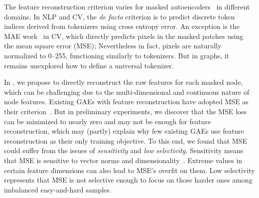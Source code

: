 The feature reconstruction criterion varies %
for masked autoencoders~\cite{devlin2019bert,he2021masked} in different domains. 
In NLP and CV, the \textit{de facto} criterion is to predict discrete token indices derived from tokenizers using cross entropy error. 
An exception is the MAE work~\cite{he2021masked} in CV, which directly predicts pixels in the masked patches using the mean square error (MSE); 
Nevertheless in fact, pixels are naturally normalized to 0--255, functioning similarly to tokenizers. 
But in graphs, it remains unexplored how to define a universal tokenizer. 

In \model, we propose to directly reconstruct the raw features for each masked node, which can be challenging due to the multi-dimensional and continuous nature of node features. 
Existing GAEs with feature reconstruction have adopted MSE as their criterion~\cite{wang2017mgae,park2019symmetric,jin2020self}. 
But in preliminary experiments, we discover that 
the MSE loss can be minimized to nearly zero
and may not be enough for feature reconstruction, which may (partly) explain why few existing GAEs use feature reconstruction as their only training objective. 
To this end, we found that MSE could suffer from the issues of \textit{sensitivity} and \textit{low selectivity}. Sensitivity means that MSE is sensitive to vector norms and dimensionality~\cite{Friedman2004OnBV}. Extreme values in certain feature dimensions can also lead to MSE’s overfit on them. Low selectivity represents that MSE is not selective enough to focus on those harder ones among imbalanced easy-and-hard samples. 

